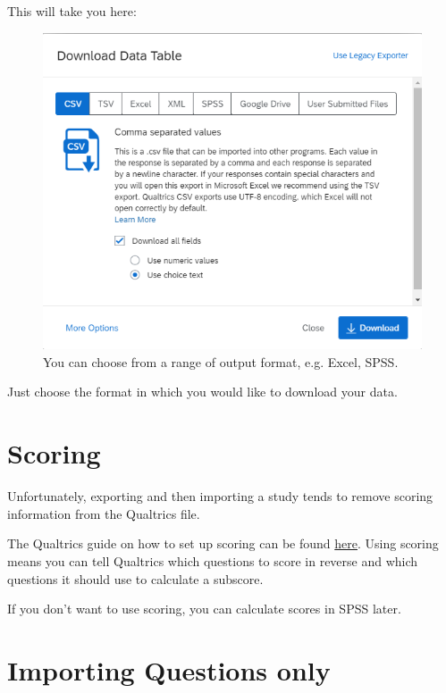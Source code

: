 \documentclass[
]{book}
\begin{document}
This will take you here:

\begin{figure}

{\centering \includegraphics[width=0.85\linewidth]{images/Qualtrics/15exportdata} 

}

\caption{You can choose from a range of output format, e.g. Excel, SPSS.}\label{fig:Figure11-15}
\end{figure}

Just choose the format in which you would like to download your data.

\hypertarget{scoring}{%
\section{Scoring}\label{scoring}}

Unfortunately, exporting and then importing a study tends to remove scoring information from the Qualtrics file.

The Qualtrics guide on how to set up scoring can be found \href{https://www.qualtrics.com/support/survey-platform/survey-module/survey-tools/scoring/}{here}. Using scoring means you can tell Qualtrics which questions to score in reverse and which questions it should use to calculate a subscore.

If you don't want to use scoring, you can calculate scores in SPSS later.

\hypertarget{importing-questions-only}{%
\section{Importing Questions only}\label{importing-questions-only}}
\end{document}
